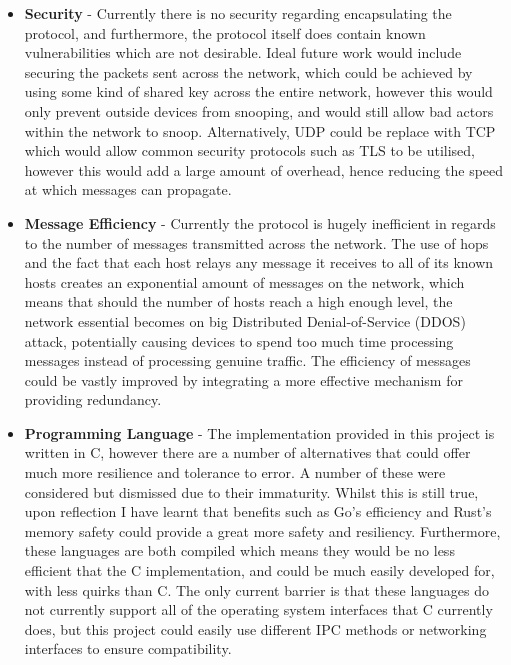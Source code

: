 \documentclass[a4paper, 11pt]{report}
\begin{document}
\begin{itemize}
\item \textbf{Security} - Currently there is no security regarding encapsulating the protocol, and furthermore, the protocol itself does contain known vulnerabilities which are not desirable. Ideal future work would include securing the packets sent across the network, which could be achieved by using some kind of shared key across the entire network, however this would only prevent outside devices from snooping, and would still allow bad actors within the network to snoop. Alternatively, \acrshort{UDP} could be replace with \acrshort{TCP} which would allow common security protocols such as TLS to be utilised, however this would add a large amount of overhead, hence reducing the speed at which messages can propagate.

\item \textbf{Message Efficiency} - Currently the protocol is hugely inefficient in regards to the number of messages transmitted across the network. The use of hops and the fact that each host relays any message it receives to all of its known hosts creates an exponential amount of messages on the network, which means that should the number of hosts reach a high enough level, the network essential becomes on big Distributed Denial-of-Service (DDOS) attack, potentially causing devices to spend too much time processing messages instead of processing genuine traffic. The efficiency of messages could be vastly improved by integrating a more effective mechanism for providing redundancy.

\item \textbf{Programming Language} - The implementation provided in this project is written in C, however there are a number of alternatives that could offer much more resilience and tolerance to error. A number of these were considered but dismissed due to their immaturity. Whilst this is still true, upon reflection I have learnt that benefits such as Go's efficiency and Rust's memory safety could provide a great more safety and resiliency. Furthermore, these languages are both compiled which means they would be no less efficient that the C implementation, and could be much easily developed for, with less quirks than C. The only current barrier is that these languages do not currently support all of the operating system interfaces that C currently does, but this project could easily use different \acrshort{IPC} methods or networking interfaces to ensure compatibility.

\end{itemize}
\end{document}
